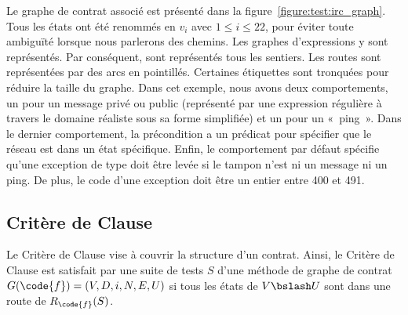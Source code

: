 %
Le graphe de contrat associé est présenté dans la
figure~\ref{figure:test:irc_graph}. Tous les états ont été renommés en $v_i$
avec $1 \leq i \leq 22$, pour éviter toute ambiguïté lorsque nous parlerons des
chemins. Les graphes d'expressions y sont représentés. Par conséquent, sont
représentés tous les sentiers. Les routes sont représentées par des arcs en
pointillés. Certaines étiquettes sont tronquées pour réduire la taille du
graphe. Dans cet exemple, nous avons deux comportements, un pour un message
privé ou public (représenté par une expression régulière à travers le domaine
réaliste  sous sa forme simplifiée) et un pour un «~ping~». Dans le
dernier comportement, la précondition a un prédicat pour spécifier que le réseau
est dans un état spécifique. Enfin, le comportement par défaut spécifie qu'une
exception de type 
doit être levée si le tampon n'est ni un message ni un ping. De plus, le code
d'une exception doit être un entier entre 400 et 491.

\subsection{Critère de Clause}

Le Critère de Clause vise à couvrir la structure d'un contrat. Ainsi, le Critère
de Clause est satisfait par une suite de tests $S$ d'une méthode  de
graphe de contrat $G(\code{f}) = (V, D, i, N, E, U)$ si tous les états de $V
\bslash U$ sont dans une route de $R_\code{f}(S)$.

